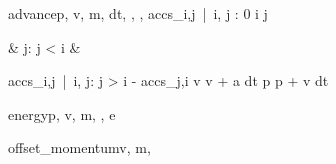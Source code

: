 \documentclass[12pt,a4paper]{book}
\begin{document}
\begin{eqcode}{advance}{p, v, m, dt}{, ,
, }{}
    accs_{i,j}\  |\  i, j : 0 \leq i   \leq j  \gets
        \begin{cases}
             & j:  j < i  & \otherwise \lend
        \end{cases} \lend
    accs_{i,j}\  |\  i, j:  j > i \gets - accs_{j,i} \lend
    v \gets v + a \cdot dt \lend
    p \gets p + v \cdot dt \lend
\end{eqcode}

\begin{eqcode}{energy}{p, v, m}{,
    , }{}
    e \in {} \lend
     \lend
\end{eqcode}

\begin{eqcode}{offset\_momentum}{v, m}{,
}{}
     \lend
\end{eqcode}
\end{document}
